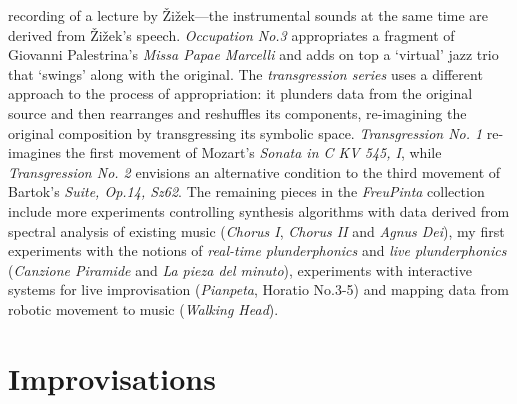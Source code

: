 recording of a lecture by \v{Z}i\v{z}ek---the instrumental sounds at the same time are derived from \v{Z}i\v{z}ek's speech. \emph{Occupation No.3} appropriates a fragment of Giovanni Palestrina's \emph{Missa Papae Marcelli} and adds on top a `virtual' jazz trio that `swings' along with the original. The \emph{transgression series} uses a different approach to the process of appropriation: it plunders data from the original source and then rearranges and reshuffles its components, re-imagining the original composition by transgressing its symbolic space. \emph{Transgression No. 1} re-imagines the first movement of Mozart's \emph{Sonata in C KV 545, I}, while \emph{Transgression No. 2} envisions an alternative condition to the third movement of Bartok's \emph{Suite, Op.14, Sz62}. The remaining pieces in the \emph{FreuPinta} collection include more experiments controlling synthesis algorithms with data derived from spectral analysis of existing music (\emph{Chorus I}, \emph{Chorus II} and \emph{Agnus Dei}), my first experiments with the notions of \emph{real-time plunderphonics} and \emph{live plunderphonics} (\emph{Canzione Piramide} and \emph{La pieza del minuto}), experiments with interactive systems for live improvisation (\emph{Pianpeta}, Horatio No.3-5) and mapping data from robotic movement to music (\emph{Walking Head}).

\section{Improvisations}

